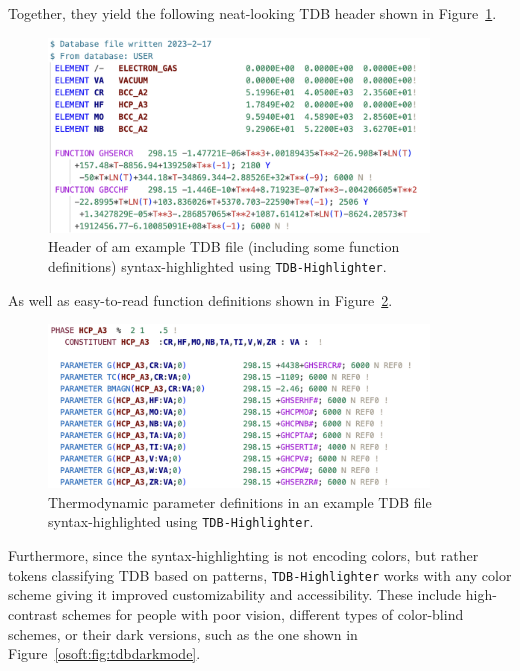 Together, they yield the following neat-looking TDB header shown in Figure~\ref{osoft:fig:tdbheader}.

\begin{figure}[H]
    \centering
    \includegraphics[width=0.9\textwidth]{tangentialsoft/Fig1.png}
    \caption{Header of am example TDB file (including some function definitions) syntax-highlighted using \texttt{TDB-Highlighter}.}
    \label{osoft:fig:tdbheader}
\end{figure}

As well as easy-to-read function definitions shown in Figure~\ref{osoft:fig:tdbfunctions}.

\begin{figure}[H]
    \centering
    \includegraphics[width=0.9\textwidth]{tangentialsoft/Fig2-2.png}
    \caption{Thermodynamic parameter definitions in an example TDB file syntax-highlighted using \texttt{TDB-Highlighter}.}
    \label{osoft:fig:tdbfunctions}
\end{figure}

Furthermore, since the syntax-highlighting is not encoding colors, but rather tokens classifying TDB based on patterns, \texttt{TDB-Highlighter} works with any color scheme giving it improved customizability and accessibility. These include high-contrast schemes for people with poor vision, different types of color-blind schemes, or their dark versions, such as the one shown in Figure~\ref{osoft:fig:tdbdarkmode}.

